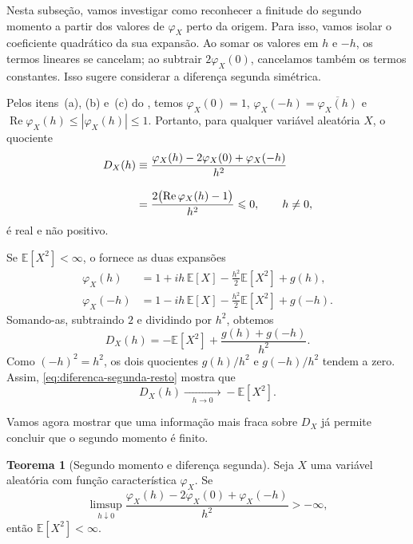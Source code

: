 \documentclass[12pt,portuguese]{article}
\theoremstyle{definition}
\newtheorem{theorem}{Teorema}
\theoremstyle{plainexercise}
\theoremstyle{starredexercise}
\theoremstyle{definition}
\begin{document}
Nesta subseção, vamos investigar como reconhecer a finitude do segundo momento
a partir dos valores de $\varphi_X$ perto da origem. Para isso,
vamos isolar o coeficiente quadrático da sua expansão.
Ao somar os valores em $h$ e $-h$,
os termos lineares se cancelam; ao subtrair $2\varphi_X(0)$,
cancelamos também os termos constantes. Isso sugere considerar
a diferença segunda simétrica.

Pelos itens~(a), (b) e~(c) do , temos
$\varphi_X(0)=1$, $\varphi_X(-h)=\overline{\varphi_X(h)}$ e
$\operatorname{Re}\varphi_X(h)\leqslant|\varphi_X(h)|\leqslant1$.
Portanto, para qualquer variável aleatória $X$, o quociente
\begin{align}
D_X(h)
&\equiv\frac{\varphi_X(h)-2\varphi_X(0)+\varphi_X(-h)}{h^2}\notag
\\[0.3cm]
&=\frac{2\bigl(\operatorname{Re}\varphi_X(h)-1\bigr)}{h^2}
\leqslant0,
\qquad h\neq0,
\label{eq:diferenca-segunda-fc}
\end{align}
é real e não positivo.

Se $\mathbb{E}[X^2]<\infty$, o 
fornece as duas expansões
\begin{align*}
\varphi_X(h)
&=1+ih\,\mathbb{E}[X]-\frac{h^2}{2}\mathbb{E}[X^2]+g(h),
\\[0.3cm]
\varphi_X(-h)
&=1-ih\,\mathbb{E}[X]-\frac{h^2}{2}\mathbb{E}[X^2]+g(-h).
\end{align*}
Somando-as, subtraindo $2$ e dividindo por $h^2$, obtemos
\begin{equation}\label{eq:diferenca-segunda-resto}
D_X(h)=-\mathbb{E}[X^2]+\frac{g(h)+g(-h)}{h^2}.
\end{equation}
Como $(-h)^2=h^2$, os dois quocientes $g(h)/h^2$ e
$g(-h)/h^2$ tendem a zero. Assim,
\eqref{eq:diferenca-segunda-resto} mostra que
\[
D_X(h)
\xrightarrow[\quad h\to 0\quad ]{}
-\mathbb{E}[X^2].
\]

Vamos agora mostrar que uma informação mais fraca sobre $D_X$
já permite concluir que o segundo momento é finito.

\begin{theorem}[Segundo momento e diferença segunda]\label{thm:segundo-momento-finito}
Seja $X$ uma variável aleatória com função característica $\varphi_X$.
Se
\[
\limsup_{h\downarrow0}
\frac{\varphi_X(h)-2\varphi_X(0)+\varphi_X(-h)}{h^2}
>-\infty,
\]
então $\mathbb{E}[X^2]<\infty$.
\end{theorem}
\end{document}
